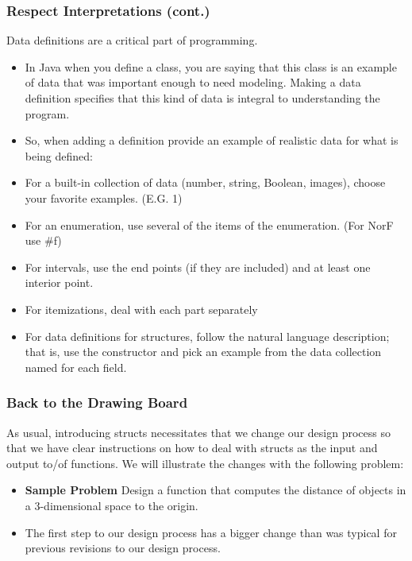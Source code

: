 \documentclass{beamer}
\begin{document}
\begin{frame}
  \frametitle{Respect Interpretations (cont.)}
  Data definitions are a critical part of programming.
  \begin{itemize}
  \item<2-> In Java
    when you define a class, you are saying that this class is an example
    of data that was important enough to need modeling. Making a data definition specifies that this kind of data is integral to understanding the program.  
  \item<3-> So, when adding a definition provide an example of realistic
    data for what is being defined:
  \item<4-> For a built-in collection of data (number, string, Boolean, images), choose your favorite examples. (E.G. 1)
  \item<5-> For an enumeration, use several of the items of the enumeration. (For NorF use \#f)
  \item<6-> For intervals, use the end points (if they are included) and at least one interior point.
  \item<7-> For itemizations, deal with each part separately
  \item<8-> For data definitions for structures, follow the natural language description; that is, use the constructor and pick an example from the data collection named for each field.
  \end{itemize}
\end{frame}

\begin{frame}
  \frametitle{Back to the Drawing Board}
  As usual, introducing structs necessitates that we change our design process so that we have clear
  instructions on how to deal with structs as the input and output to/of functions. We will
  illustrate the changes with the following problem:
  \begin{itemize}
  \item<2-> \textbf{Sample Problem} Design a function that computes the distance of objects in a 3-dimensional space to the origin.
  \item<3-> The first step to our design process has a bigger change than was typical for previous revisions to our design process.
  \end{itemize}
\end{frame}
\end{document}
